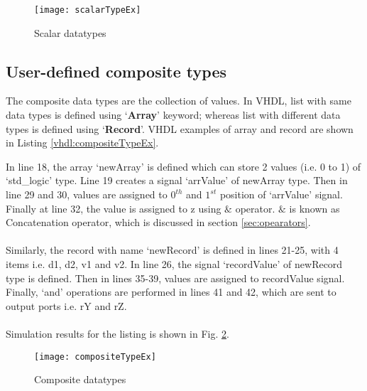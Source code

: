 

\begin{figure}[!h]
	\centering
	\texttt{[image: scalarTypeEx]}
	\caption{Scalar datatypes}
	\label{fig:scalarTypeEx}
\end{figure}

\subsection{User-defined composite types}
The composite data types are the collection of values. In VHDL, list with same data types is defined using `\textbf{Array}' keyword; whereas list with different data types is defined using `\textbf{Record}'. VHDL examples of array and record are shown in Listing \ref{vhdl:compositeTypeEx}.

\begin{explanation}
	In line 18, the array `newArray' is defined which can store 2 values (i.e. 0 to 1) of `std\_logic' type. Line 19 creates a signal `arrValue' of newArray type. Then in line 29 and 30, values are assigned to $0^{th}$ and $1^{st}$ position of `arrValue' signal. Finally at line 32, the value is assigned to z using $\&$ operator. $\&$ is known as Concatenation operator, which is discussed in section \ref{sec:opearators}.
	\\ \\
	Similarly, the record with name `newRecord' is defined in lines 21-25, with 4 items i.e. d1, d2, v1 and v2. In line 26, the signal `recordValue' of newRecord type is defined. Then in lines 35-39, values are assigned to recordValue signal. Finally, `and' operations are performed in lines 41 and 42, which are sent to output ports i.e. rY and rZ. 
	\\ \\
	Simulation results for the listing is shown in Fig. \ref{fig:compositeTypeEx}. 
\end{explanation}


\begin{figure}[!h]
	\centering
	\texttt{[image: compositeTypeEx]}
	\caption{Composite datatypes}
	\label{fig:compositeTypeEx}
\end{figure}



